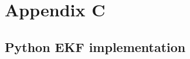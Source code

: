 %
%

\chapter{Appendix C}\label{app:app03}
\section{Python EKF implementation}\label{sec:py_ekf} %

